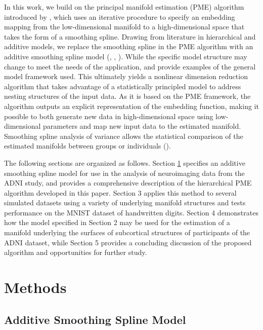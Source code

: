\documentclass[11pt,reqno]{article}
\theoremstyle{definition}
\begin{document}
In this work, we build on the principal manifold estimation (PME) algorithm introduced by \cite{mengPrincipalManifoldEstimation2021}, which uses an iterative procedure to specify an embedding mapping from the low-dimensional manifold to a high-dimensional space that takes the form of a smoothing spline. Drawing from literature in hierarchical and additive models, we replace the smoothing spline in the PME algorithm with an additive smoothing spline model (\cite{gelmanDataAnalysisUsing2007}, \cite{hastieGeneralizedAdditiveModels1990}, \cite{gelmanBayesianDataAnalysis2014}). While the specific model structure may change to meet the needs of the application, \cite{brumbackSmoothingSplineModels1998} and \cite{schulamFrameworkIndividualizingPredictions2015a} provide examples of the general model framework used. This ultimately yields a nonlinear dimension reduction algorithm that takes advantage of a statistically principled model to address nesting structures of the input data. As it is based on the PME framework, the algorithm outputs an explicit representation of the embedding function, making it possible to both generate new data in high-dimensional space using low-dimensional parameters and map new input data to the estimated manifold. Smoothing spline analysis of variance allows the statistical comparison of the estimated manifolds between groups or individuals (\cite{wangMixedEffectsSmoothing1998}).

The following sections are organized as follows. Section \ref{s:methods} specifies an additive smoothing spline model for use in the analysis of neuroimaging data from the ADNI study, and provides a comprehensive description of the hierarchical PME algorithm developed in this paper. Section 3 applies this method to several simulated datasets using a variety of underlying manifold structures and tests performance on the MNIST dataset of handwritten digits. Section 4 demonstrates how the model specified in Section 2 may be used for the estimation of a manifold underlying the surfaces of subcortical structures of participants of the ADNI dataset, while Section 5 provides a concluding discussion of the proposed algorithm and opportunities for further study.

\section{Methods}\label{s:methods}

\subsection{Additive Smoothing Spline Model}
\end{document}

